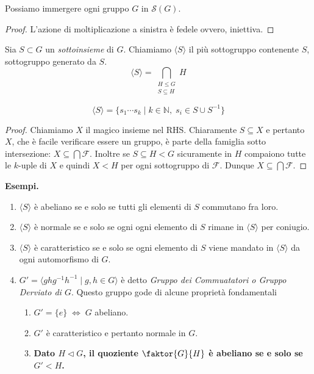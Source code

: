 \begin{multicols}{2}
\begin{theorem}[Cayley]\label{Cayley}
	Possiamo immergere ogni gruppo $ G $ in $ \mathcal{S}(G) $.
\end{theorem}
\begin{proof}
	L'azione di moltiplicazione a sinistra è fedele
	ovvero, iniettiva.
\end{proof}

\begin{definition}
	Sia $ S \subset G $ un \emph{sottoinsieme} di $ G $. Chiamiamo $ \langle S \rangle $ il più sottogruppo contenente $ S $, sottogruppo generato da $ S $. \[ \langle S \rangle = \bigcap_{\substack{H \leq G \\ S \subseteq H }} H  \]
\end{definition}
\begin{prop}
	\[ \langle S \rangle = \{ s_1 \cdots s_k \mid k \in \mathbb{N}, \; s_i \in S \cup S^{-1} \} \]
\end{prop}
\begin{proof}
	Chiamiamo $ X $ il magico insieme nel RHS. Chiaramente $ S \subseteq X $ e pertanto $ X $, che è facile verificare essere un gruppo, è parte della famiglia sotto intersezione: $ X \subseteq \bigcap \mathcal{F} $. Inoltre se $S \subseteq H < G $ sicuramente in $ H $ compaiono tutte le $ k $-uple di $ X $ e quindi $ X < H $ per ogni sottogruppo di $ \mathcal{F} $. Dunque $ X \subseteq \bigcap\mathcal{F} $.
\end{proof}

\textbf{Esempi.}
\begin{enumerate}
	\item $ \langle S \rangle $ è abeliano se e solo se tutti gli elementi di $ S $ commutano fra loro.
	\item $ \langle S \rangle $ è normale se e solo se ogni ogni elemento di $ S $ rimane in $ \langle S \rangle $ per coniugio.
	\item $ \langle S \rangle $ è caratteristico se e solo se ogni elemento di $ S $ viene mandato in $ \langle S \rangle $ da ogni automorfismo di $ G $.
	\item $ G' = \langle ghg^{-1}h^{-1} \mid g, h \in G \rangle $ è detto \emph{Gruppo dei Commuatatori o Gruppo Derviato di $ G $}. Questo gruppo gode di alcune proprietà fondamentali
	
	\begin{enumerate}
		\item $ G' = \{ e \} \;\Leftrightarrow\; G $ abeliano.
		\item $ G' $ è caratteristico e pertanto normale in $ G $.
		\item \textbf{Dato $ H \lhd G $, il quoziente $ \faktor{G}{H} $ è abeliano se e solo se $ G' < H $.}
	

\end{enumerate}
\end{enumerate}
\end{multicols}
